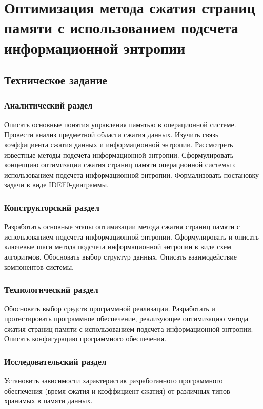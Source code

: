 \documentclass{bmstu}
\begin{document}
\chapter*{Оптимизация метода сжатия страниц памяти с использованием подсчета информационной энтропии}

\section*{Техническое задание}

\subsection{Аналитический раздел}

Описать основные понятия управления памятью в операционной системе. Провести анализ предметной области сжатия данных. Изучить связь коэффициента сжатия данных и информационной энтропии. Рассмотреть известные методы подсчета информационной энтропии. Сформулировать концепцию оптимизации сжатия страниц памяти операционной системы с использованием подсчета информационной энтропии. Формализовать постановку задачи в виде IDEF0-диаграммы.

\subsection{Конструкторский раздел}

Разработать основные этапы оптимизации метода сжатия страниц памяти с использованием подсчета информационной энтропии. Сформулировать и описать ключевые шаги метода подсчета информационной энтропии в виде схем алгоритмов. Обосновать выбор структур данных. Описать взаимодействие компонентов системы.

\subsection{Технологический раздел}

Обосновать выбор средств программной реализации. Разработать и протестировать программное обеспечение, реализующее оптимизацию метода сжатия страниц памяти с использованием подсчета информационной энтропии. Описать конфигурацию программного обеспечения.

\subsection{Исследовательский раздел}

Установить зависимости характеристик разработанного программного обеспечения (время сжатия и коэффициент сжатия) от различных типов хранимых в памяти данных.
\end{document}
